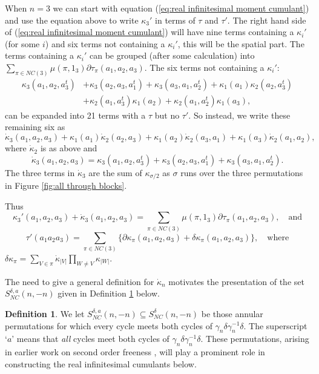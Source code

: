 \documentclass[11pt]{amsart}
\theoremstyle{definition}
\newtheorem{definition}[theorem]{Definition}
\numberwithin{theorem}{section}
\newcommand{\NC}{\mathit{NC}}
\begin{document}
When $n = 3$ we can start with equation (\ref{eq:real
  infinitesimal moment cumulant}) and use the equation above
to write $\kappa_3'$ in terms of $\tau$ and $\tau'$. The
right hand side of (\ref{eq:real infinitesimal moment
  cumulant}) will have nine terms containing a $\kappa_i'$
(for some $i$) and six terms not containing a $\kappa_i'$,
this will be the spatial part. The terms containing a
$\kappa_i'$ can be grouped (after some calculation) into
$\sum_{\pi \in \NC(3)} \mu(\pi, 1_3) \partial\tau_\pi(a_1,
a_2, a_3)$. The six terms not containing a $\kappa_i'$:
\begin{align*} 
\kappa_3(a_1, a_2, a_3^t) &+ \kappa_3(a_2, a_3, a_1^t) + \kappa_3(a_3, a_1, a_2^t)
+ \kappa_1(a_1) \kappa_2(a_2, a_3^t)  \\
& + 
\kappa_2(a_1, a_3^t) \kappa_1(a_2) + \kappa_2(a_1, a_2^t) \kappa_1(a_3),
\end{align*}
can be expanded into 21 terms with a $\tau$ but no
$\tau'$. So instead, we write these remaining six as
\[
\dot{\kappa}_3(a_1, a_2, a_3) + \kappa_1(a_1) \dot\kappa_2(a_2, a_3) + \kappa_1(a_2) \dot\kappa_2(a_3, a_1) + \kappa_1(a_3) \dot\kappa_2(a_1, a_2),
\]
where $\dot\kappa_2$ is as above and
\[
\dot\kappa_3(a_1, a_2, a_3) =
\kappa_3(a_1, a_2, a_3^t) + \kappa_3(a_2, a_3, a_1^t) + \kappa_3(a_3, a_1, a_2^t).
\]
The three terms in $\dot\kappa_3$ are the sum of
$\kappa_{\sigma/2}$ as $\sigma$ runs over the three
permutations in Figure \ref{fig:all through blocks}.

Thus
\[
\kappa_3'(a_1, a_2, a_3) + \dot{\kappa}_3(a_1, a_2, a_3) = \sum_{\pi \in \NC(3)} \mu(\pi, 1_3)
\partial\tau_\pi(a_1, a_2, a_3), \quad\mbox{and}
\]
\[
\tau'(a_1a_2a_3)
=
\sum_{\pi \in \NC(3)} \{\partial\kappa_\pi(a_1, a_2, a_3) + \delta\kappa_\pi(a_1, a_2, a_3)\}, \quad\mbox{where}
\]
$ \delta\kappa_\pi = \sum_{V \in \pi} \dot\kappa_{{\scriptscriptstyle |V|}} \prod_{W \not= V} \kappa_{{\scriptscriptstyle |W|}}$.

The need to give a general definition for $\dot{\kappa}_n$
motivates the presentation of the set $S_\NC^{\delta, a}(n,
-n)$ given in Definition \ref{def:all through cycles} below.



\begin{definition}\label{def:all through cycles}
We let $S_\NC^{\delta, a}(n, -n) \subseteq S_\NC^\delta(n,
-n)$ be those annular permutations for which every cycle
meets both cycles of $\gamma_n \delta \gamma_n^{-1}
\delta$. The superscript `$a$' means that \textit{all}
cycles meet both cycles of $\gamma_n \delta \gamma_n^{-1}
\delta$. These permutations, arising in earlier work on
second order freeness \cite[Prop. 6.1]{cmss}, will play a
prominent role in constructing the real infinitesimal
cumulants below.
\end{definition}
\end{document}
